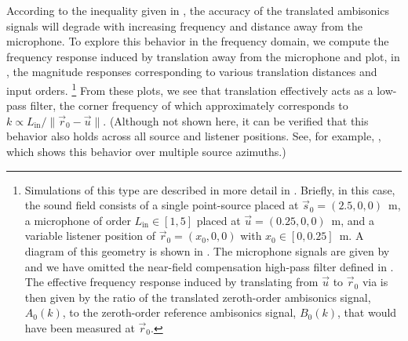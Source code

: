 According to the inequality given in , the accuracy of the translated ambisonics signals will degrade with increasing frequency and distance away from the microphone.
To explore this behavior in the frequency domain, we compute the frequency response induced by translation away from the microphone and plot, in , the magnitude responses corresponding to various translation distances and input orders.%
\footnote{Simulations of this type are described in more detail in .
Briefly, in this case, the sound field consists of a single point-source placed at $\vec{s}_0 = (2.5, 0, 0)$~m, a microphone of order $L_\text{in} \in [1,5]$ placed at $\vec{u} = (0.25, 0, 0)$~m, and a variable listener position of $\vec{r}_0 = (x_0, 0, 0)$ with $x_0 \in [0, 0.25]$~m.
A diagram of this geometry is shown in .
The microphone signals are given by  and we have omitted the near-field compensation high-pass filter defined in .
The effective frequency response induced by translating from $\vec{u}$ to $\vec{r}_0$ via  is then given by the ratio of the translated zeroth-order ambisonics signal, $A_0(k)$, to the zeroth-order reference ambisonics signal, $B_0(k)$, that would have been measured at $\vec{r}_0$.}
From these plots, we see that translation effectively acts as a low-pass filter, the corner frequency of which approximately corresponds to $k \propto L_\text{in} / \| \vec{r}_0 - \vec{u} \|$.
(Although not shown here, it can be verified that this behavior also holds across all source and listener positions.
See, for example, , which shows this behavior over multiple source azimuths.)

